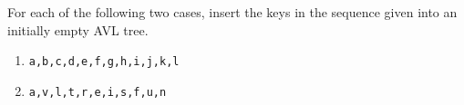 For each of the following two cases, insert the keys in the sequence
given into an initially empty AVL tree.

\begin{enumerate}

\item   {\tt a,b,c,d,e,f,g,h,i,j,k,l}

\item   {\tt a,v,l,t,r,e,i,s,f,u,n}

\end{enumerate}

